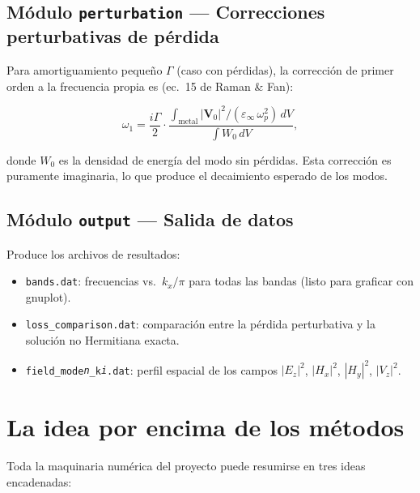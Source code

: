 \documentclass[12pt,a4paper]{article}
\begin{document}
\subsection{Módulo \texttt{perturbation} — Correcciones perturbativas de pérdida}

Para amortiguamiento pequeño $\Gamma$ (caso con pérdidas), la corrección de primer orden a la frecuencia propia es (ec.\ 15 de Raman \& Fan):

\begin{equation}
    \omega_1 = \frac{i\Gamma}{2} \cdot
    \frac{\displaystyle\int_{\text{metal}} |\mathbf{V}_0|^2 / (\varepsilon_\infty\,\omega_p^2)\,dV}
         {\displaystyle\int W_0\,dV},
\end{equation}

donde $W_0$ es la densidad de energía del modo sin pérdidas. Esta corrección es puramente imaginaria, lo que produce el decaimiento esperado de los modos.

\subsection{Módulo \texttt{output} — Salida de datos}

Produce los archivos de resultados:
\begin{itemize}
    \item \texttt{bands.dat}: frecuencias vs.\ $k_x/\pi$ para todas las bandas (listo para graficar con gnuplot).
    \item \texttt{loss\_comparison.dat}: comparación entre la pérdida perturbativa y la solución no Hermitiana exacta.
    \item \texttt{field\_mode\textit{n}\_k\textit{i}.dat}: perfil espacial de los campos $|E_z|^2$, $|H_x|^2$, $|H_y|^2$, $|V_z|^2$.
\end{itemize}

\section{La idea por encima de los métodos}

Toda la maquinaria numérica del proyecto puede resumirse en tres ideas encadenadas:
\end{document}

